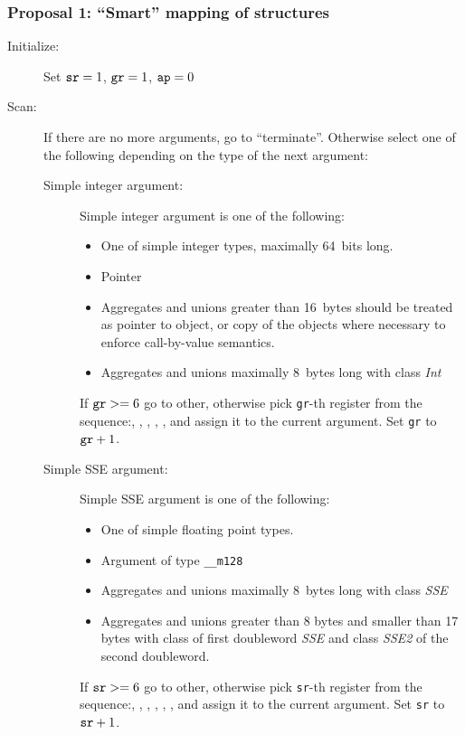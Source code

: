 \subsubsection {Proposal 1: ``Smart'' mapping of structures}

\begin{description}
  \item[Initialize:]
    Set $\verb|sr|=1$, $\verb|gr|=1$, $\verb|ap|=0$


  \item[Scan:]
    If there are no more arguments, go to ``terminate''. Otherwise select one of the
    following depending on the type of the next argument:
      \begin{description}
        \item[Simple integer argument:]
          Simple integer argument is one of the following:
          \begin{itemize}
            \item One of simple integer types, maximally 64~bits long.
            \item Pointer
            \item Aggregates and unions greater than 16~bytes should be treated as
              pointer to object, or copy of the objects where necessary to enforce
              call-by-value semantics.
            \item Aggregates and unions maximally 8~bytes long with class \emph{Int}
          \end{itemize}
        If $\verb|gr| >= 6$ go to other, otherwise pick \verb|gr|-th register from
        the sequence:\RAX, \RDX, \RCX, \RBX, \RSI, \RDI{} and assign it to the current
        argument. Set \verb|gr| to $\verb|gr|+1$.


    \item[Simple SSE argument:]
      Simple SSE argument is one of the following:
      \begin{itemize}
        \item One of simple floating point types.
        \item Argument of type \verb|__m128|
        \item Aggregates and unions maximally 8~bytes long with class \emph{SSE}
        \item Aggregates and unions greater than 8 bytes and smaller
          than 17 bytes with class of first doubleword \emph{SSE}
          and class \emph{SSE2} of the second doubleword.
      \end{itemize}
      If $\verb|sr| >= 6$ go to other, otherwise pick \verb|sr|-th register from
      the sequence:, , , , , , 
      and assign it to the current argument.
      Set \verb|sr| to $\verb|sr|+1$.


\end{description}
\end{description}
